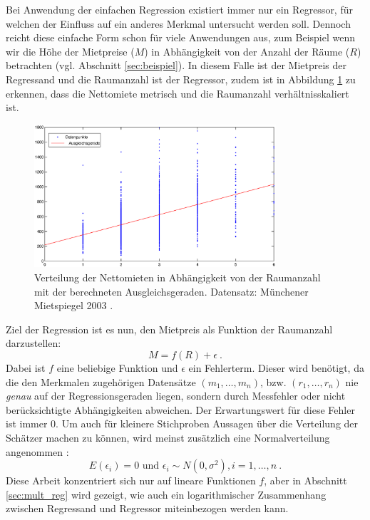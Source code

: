 Bei Anwendung der einfachen Regression existiert immer nur ein Regressor, für welchen der Einfluss auf ein anderes Merkmal untersucht werden soll.
Dennoch reicht diese einfache Form schon für viele Anwendungen aus, zum Beispiel wenn wir die Höhe der Mietpreise ($M$) in Abhängigkeit von der Anzahl der Räume ($R$) betrachten (vgl. Abschnitt \ref{sec:beispiel}).
In diesem Falle ist der Mietpreis der Regressand und die Raumanzahl ist der Regressor, zudem ist in Abbildung \ref{fig:nm_rooms_distribution} zu erkennen, dass die Nettomiete metrisch und die Raumanzahl verhältnisskaliert ist.
\begin{figure}[t]
  \centering
  \includegraphics[width=0.8\textwidth]{figures/nm_rooms_distribution}
  \caption{Verteilung der Nettomieten in Abhängigkeit von der Raumanzahl mit der berechneten Ausgleichsgeraden. Datensatz: Münchener Mietspiegel 2003 \cite{Fahrmeir2011}.}
  \label{fig:nm_rooms_distribution}
\end{figure}
Ziel der Regression ist es nun, den Mietpreis als Funktion der Raumanzahl darzustellen:
\begin{equation*}
 M = f(R) + \epsilon ~.
\end{equation*}
Dabei ist $f$ eine beliebige Funktion und $\epsilon$ ein Fehlerterm.
Dieser wird benötigt, da die den Merkmalen zugehörigen Datensätze $(m_1, \dots, m_n)$, bzw. $(r_1, \dots, r_n)$ nie \textit{genau} auf der Regressionsgeraden liegen, sondern durch Messfehler oder nicht berücksichtigte Abhängigkeiten abweichen.
Der Erwartungswert für diese Fehler ist immer $0$. 
Um auch für kleinere Stichproben Aussagen über die Verteilung der Schätzer machen zu können, wird meinst zusätzlich eine Normalverteilung angenommen \cite[S. 479]{Fahrmeir2010}:
\begin{equation*}
  E(\epsilon_i) = 0 \text{ und } \epsilon_i \sim N(0,\sigma^2), i = 1, \dots, n ~.
\end{equation*}
Diese Arbeit konzentriert sich nur auf lineare Funktionen $f$, aber in Abschnitt \ref{sec:mult_reg} wird gezeigt, wie auch ein logarithmischer Zusammenhang zwischen Regressand und Regressor miteinbezogen werden kann.
